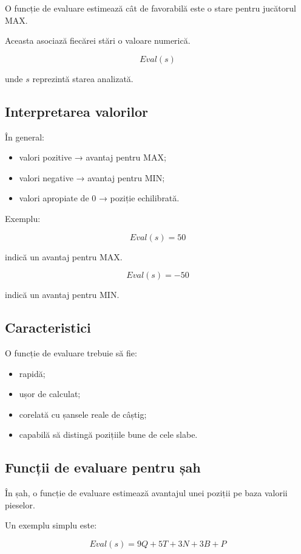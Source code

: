 \documentclass[12pt,a4paper]{article}
\begin{document}
O funcție de evaluare estimează cât de favorabilă este o stare pentru jucătorul MAX.

Aceasta asociază fiecărei stări o valoare numerică.

\[
Eval(s)
\]

unde $s$ reprezintă starea analizată.

\subsection{Interpretarea valorilor}

În general:

\begin{itemize}
\item valori pozitive → avantaj pentru MAX;
\item valori negative → avantaj pentru MIN;
\item valori apropiate de 0 → poziție echilibrată.
\end{itemize}

Exemplu:

\[
Eval(s)=50
\]

indică un avantaj pentru MAX.

\[
Eval(s)=-50
\]

indică un avantaj pentru MIN.

\subsection{Caracteristici}

O funcție de evaluare trebuie să fie:

\begin{itemize}
\item rapidă;
\item ușor de calculat;
\item corelată cu șansele reale de câștig;
\item capabilă să distingă pozițiile bune de cele slabe.
\end{itemize}

\subsection{Funcții de evaluare pentru șah}

În șah, o funcție de evaluare estimează avantajul unei poziții pe baza valorii pieselor.

Un exemplu simplu este:

\[
Eval(s)=9Q+5T+3N+3B+P
\]
\end{document}

